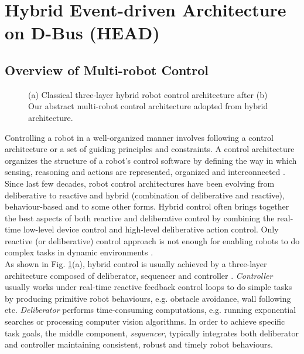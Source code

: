 \documentclass[draft]{ifacconf}
\begin{document}
\section{Hybrid Event-driven Architecture on D-Bus (HEAD)}
\label{sec:head}
\subsection{Overview of Multi-robot Control}
 \begin{figure}
\centering
{} 
\hspace{0.25cm}
\caption{(a) Classical three-layer hybrid robot control architecture after \cite{Gat1997} 
(b) Our abstract multi-robot control architecture adopted from hybrid architecture.}
\label{fig:three-layer-arch}
\end{figure}
Controlling a robot in a well-organized manner involves following a control architecture or a set of guiding principles and constraints. A control architecture organizes the structure  of a robot's control software by defining the way in which sensing, reasoning and actions are represented, organized and interconnected \citep{Bekey2005}. Since last few decades, robot control architectures have been evolving from deliberative to reactive and hybrid (combination of deliberative and reactive), behaviour-based and to some other forms.  Hybrid control often brings together the best aspects of both reactive and deliberative control by combining the real-time low-level device control and high-level deliberative action control. Only reactive (or deliberative) control approach is not enough for enabling robots to do complex tasks in dynamic environments \citep{Gat1997}.\\
 As shown in Fig. \ref{fig:three-layer-arch}(a), hybrid control is usually achieved by a three-layer architecture composed of deliberator, sequencer and controller . {\em Controller} usually works under real-time reactive feedback control loops to do simple tasks by producing primitive robot behaviours, e.g. obstacle avoidance, wall following etc. {\em Deliberator} performs time-consuming computations, e.g. running exponential searches or processing computer vision algorithms. In order to achieve specific task goals, the middle component, {\em sequencer}, typically integrates both deliberator and controller maintaining consistent, robust and timely robot behaviours.\\
\end{document}

